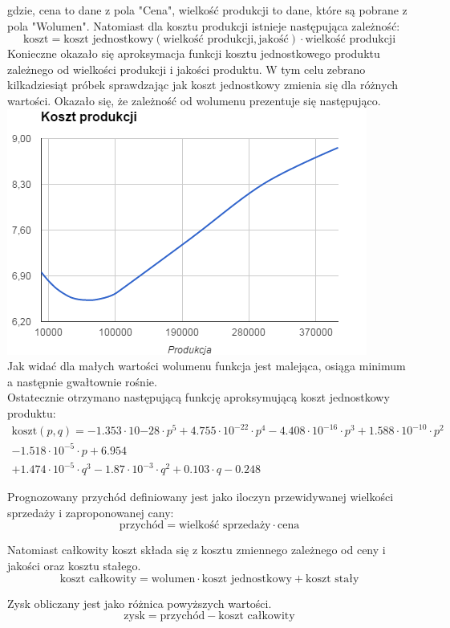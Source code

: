 \documentclass[10pt,a4paper]{article}
\begin{document}
\begin{itemize}
gdzie, cena to dane z pola "Cena", wielkość produkcji to dane, które są pobrane z pola "Wolumen".
Natomiast dla kosztu produkcji istnieje następująca zależność:
\begin{equation*}
\text{koszt} = \text{koszt jednostkowy}(\text{wielkość produkcji},\text{jakość}) \cdot \text{wielkość produkcji}
\end{equation*}
Konieczne okazało się aproksymacja funkcji kosztu jednostkowego produktu zależnego od wielkości produkcji i jakości produktu. W tym celu zebrano kilkadziesiąt próbek sprawdzając jak koszt jednostkowy zmienia się dla różnych wartości. Okazało się, że zależność od wolumenu prezentuje się następująco.
\includegraphics[scale=0.75]{koszt} \\
Jak widać dla małych wartości wolumenu funkcja jest malejąca, osiąga minimum a następnie gwałtownie rośnie.
\\
Ostatecznie otrzymano następującą funkcję aproksymującą koszt jednostkowy produktu:
\begin{multline*}
\text{koszt}(p,q) = -1.353 \cdot 10{-28} \cdot p^5 + 4.755 \cdot 10^{-22} \cdot p^4 - 4.408 \cdot 10^{-16} \cdot p^3 + 1.588 \cdot 10^{-10} \cdot p^2 \\
 - 1.518 \cdot 10^{-5} \cdot p + 6.954  \\
+ 1.474 \cdot 10^{-5} \cdot q^3- 1.87 \cdot 10^{-3} \cdot q^2+ 0.103 \cdot q -0.248
\end{multline*}

Prognozowany przychód definiowany jest jako iloczyn przewidywanej wielkości sprzedaży i zaproponowanej cany:
\begin{equation*}
\text{przychód} = \text{wielkość sprzedaży} \cdot \text{cena}
\end{equation*}

Natomiast całkowity koszt składa się z kosztu zmiennego zależnego od ceny i jakości oraz kosztu stałego.
\begin{equation*}
\text{koszt całkowity} = \text{wolumen} \cdot \text{koszt jednostkowy} + \text{koszt stały}
\end{equation*}

Zysk obliczany jest jako różnica powyższych wartości.
\begin{equation*}
\text{zysk} = \text{przychód} - \text{koszt całkowity}
\end{equation*}
\end{itemize}
\end{document}
